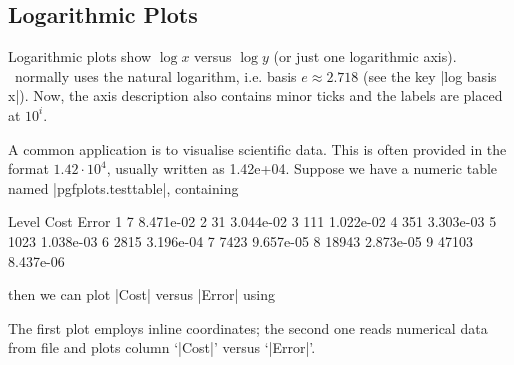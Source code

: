 \subsection{Logarithmic Plots}
Logarithmic plots show $\log x$ versus $\log y$  (or just one logarithmic axis). \PGFPlots\ normally uses the natural logarithm, i.e. basis $e\approx2.718$ (see the key |log basis x|). Now, the axis description also contains minor ticks and the labels are placed at $10^i$.
\begin{codeexample}[]
\end{codeexample}
A common application is to visualise scientific data. This is often provided in the format $1.42\cdot10^4$, usually written as 1.42e+04. Suppose we have a numeric table named |pgfplots.testtable|, containing
\begin{codeexample}[code only,tabsize=6]
Level Cost  Error
1     7     8.471e-02
2     31    3.044e-02
3     111   1.022e-02
4     351   3.303e-03
5     1023  1.038e-03
6     2815  3.196e-04
7     7423  9.657e-05
8     18943 2.873e-05
9     47103 8.437e-06
\end{codeexample}
then we can plot |Cost| versus |Error| using
\begin{codeexample}[]
\end{codeexample}
The first plot employs inline coordinates; the second one reads numerical data from file and plots column `|Cost|' versus `|Error|'.

